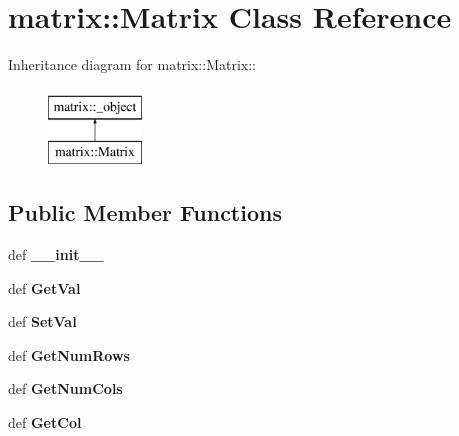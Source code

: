 \hypertarget{classmatrix_1_1Matrix}{
\section{matrix::Matrix Class Reference}
\label{dd/db9/classmatrix_1_1Matrix}
}
Inheritance diagram for matrix::Matrix::\begin{figure}[H]
\begin{center}
\leavevmode
\includegraphics[height=2cm]{dd/db9/classmatrix_1_1Matrix}
\end{center}
\end{figure}
\subsection*{Public Member Functions}
\begin{DoxyCompactItemize}
\item 
\hypertarget{classmatrix_1_1Matrix_af668028ba2f2859741988054da60ee75}{
def {\bfseries \_\-\_\-init\_\-\_\-}}
\label{dd/db9/classmatrix_1_1Matrix_af668028ba2f2859741988054da60ee75}

\item 
\hypertarget{classmatrix_1_1Matrix_a78af2756e24b6f0d74695956b2f02646}{
def {\bfseries GetVal}}
\label{dd/db9/classmatrix_1_1Matrix_a78af2756e24b6f0d74695956b2f02646}

\item 
\hypertarget{classmatrix_1_1Matrix_ae7b5ee268f12fb34ebbbe7213f91638a}{
def {\bfseries SetVal}}
\label{dd/db9/classmatrix_1_1Matrix_ae7b5ee268f12fb34ebbbe7213f91638a}

\item 
\hypertarget{classmatrix_1_1Matrix_a25ad06ac9533ca524f9f17734d6a1ad6}{
def {\bfseries GetNumRows}}
\label{dd/db9/classmatrix_1_1Matrix_a25ad06ac9533ca524f9f17734d6a1ad6}

\item 
\hypertarget{classmatrix_1_1Matrix_af4ec3fb39dcbec6b92df554051019e6d}{
def {\bfseries GetNumCols}}
\label{dd/db9/classmatrix_1_1Matrix_af4ec3fb39dcbec6b92df554051019e6d}

\item 
\hypertarget{classmatrix_1_1Matrix_a81fd68a34b15d0f2412818b39eaaf02c}{
def {\bfseries GetCol}}
\label{dd/db9/classmatrix_1_1Matrix_a81fd68a34b15d0f2412818b39eaaf02c}

\end{DoxyCompactItemize}
